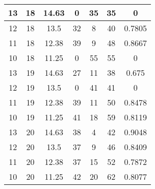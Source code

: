 \documentclass[letterpaper, 12pt]{article}
\begin{document}
\begin{longtable}{|c|c|c|c|c|c|c|}
\hline
13 & 18 & 14.63 & 0 & 35 & 35 & 0 \\
\hline
12 & 18 & 13.5 & 32 & 8 & 40 & 0.7805 \\
\hline
11 & 18 & 12.38 & 39 & 9 & 48 & 0.8667 \\
\hline
10 & 18 & 11.25 & 0 & 55 & 55 & 0 \\
\hline
13 & 19 & 14.63 & 27 & 11 & 38 & 0.675 \\
\hline
12 & 19 & 13.5 & 0 & 41 & 41 & 0 \\
\hline
11 & 19 & 12.38 & 39 & 11 & 50 & 0.8478 \\
\hline
10 & 19 & 11.25 & 41 & 18 & 59 & 0.8119 \\
\hline
13 & 20 & 14.63 & 38 & 4 & 42 & 0.9048 \\
\hline
12 & 20 & 13.5 & 37 & 9 & 46 & 0.8409 \\
\hline
11 & 20 & 12.38 & 37 & 15 & 52 & 0.7872 \\
\hline
10 & 20 & 11.25 & 42 & 20 & 62 & 0.8077 \\
\hline
\end{longtable}
\end{document}
